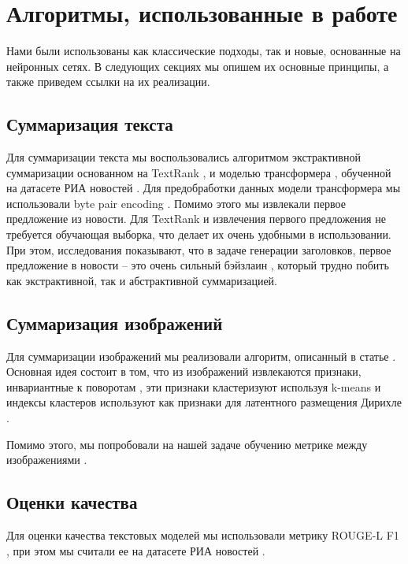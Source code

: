 \documentclass[aps,%
12pt,%
final,%
oneside,
onecolumn,%
musixtex, %
superscriptaddress,%
centertags]{article} %
\begin{document}
\section{Алгоритмы, использованные в работе}
Нами были использованы как классические подходы, так и новые, основанные на нейронных сетях.
В следующих секциях мы опишем их основные принципы, а также приведем ссылки на их реализации.

\subsection{Суммаризация текста}
Для суммаризации текста мы воспользовались алгоритмом экстрактивной суммаризации
основанном на TextRank \cite{DBLP:journals/corr/BarriosLAW16, rehurek_lrec},
и моделью трансформера \cite{DBLP:journals/corr/VaswaniSPUJGKP17}, обученной на
датасете РИА новостей \cite{gavrilov2018self}.
Для предобработки данных модели трансформера мы использовали byte
pair encoding \cite{DBLP:journals/corr/SennrichHB15}.
Помимо этого мы извлекали первое предложение из новости.
Для TextRank и извлечения первого предложения не требуется обучающая выборка, что
делает их очень удобными в использовании. При этом, исследования показывают, что
в задаче генерации заголовков, первое предложение в новости --
это очень сильный бэйзлаин \cite{gavrilov2018self},
который трудно побить как экстрактивной, так и абстрактивной суммаризацией.

\subsection{Суммаризация изображений}
Для суммаризации изображений мы реализовали алгоритм,
описанный в статье \cite{DBLP:conf/icsipa/SharmaKASK15}.
Основная идея состоит в том, что из изображений извлекаются
признаки, инвариантные к поворотам \cite{Lowe:2004:DIF:993451.996342},
эти признаки кластеризуют
используя k-means \cite{Arthur:2007:KAC:1283383.1283494} и индексы кластеров
используют как признаки для латентного размещения
Дирихле \cite{Blei:2003:LDA:944919.944937, rehurek_lrec}.

Помимо этого, мы попробовали
на нашей задаче обучению метрике между изображениями
\cite{DBLP:journals/corr/abs-1803-11095, DBLP:journals/corr/abs-1810-06951}.

\subsection{Оценки качества}
Для оценки качества текстовых моделей мы использовали метрику ROUGE-L F1 \cite{Lin:2004},
при этом мы считали ее на датасете РИА новостей \cite{gavrilov2018self}.
\end{document}
